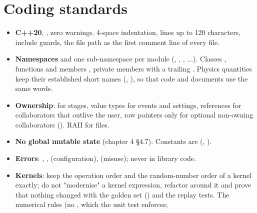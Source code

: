 \section{\texorpdfstring{Coding standards}{Coding standards}}\label{developer_manual-06u5fstandards:61-coding-standards}
\begin{itemize}
\item \textbf{C++20}, , zero warnings. 4-space indentation,\allowbreak{} lines up to 120 characters,  include guards, the file path as the first comment line of every file.
\item \textbf{Namespaces}  and one sub-namespace per module (, , , ...).
Classes , functions and members , private members with a trailing \code{\_}. Physics quantities keep
their established short names (, ), so that code and documents use the same words.
\item \textbf{Ownership}:  for stages, value types for events and settings, references for collaborators that
outlive the user, raw pointers only for optional non-owning collaborators (). RAII for files.
\item \textbf{No global mutable state} (chapter 4 §4.7). Constants are  (, ).
\item \textbf{Errors}: , ,  (configuration),\allowbreak{}  (misuse); never
 in library code.
\item \textbf{Kernels}: keep the operation order and the random-number order of a kernel exactly; do not "modernise" a kernel
expression, refactor around it and prove that nothing changed with the golden set ()
and the replay tests. The numerical rules (no , which the unit test  enforces;

\end{itemize}
